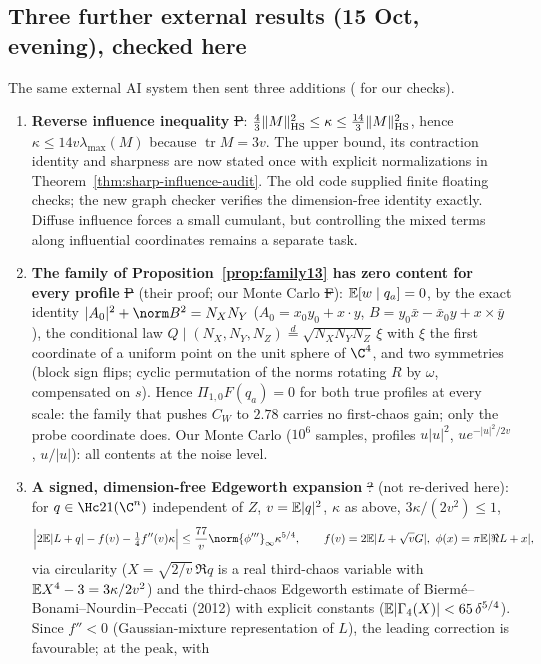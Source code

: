 \subsection{Three further external results (15 Oct, evening), checked here}\label{sec:wct-external}
The same external AI system then sent three additions ( for our checks).
\begin{enumerate}
\item \textbf{Reverse influence inequality} \st{P}: $\frac43\|M\|_{\rm HS}^2\le\kappa\le\frac{14}3\|M\|_{\rm HS}^2$, hence $\kappa\le14v\lambda_{\max}(M)$ because $\operatorname{tr}M=3v$. The upper bound, its contraction identity and sharpness are now stated once with explicit normalizations in Theorem~\ref{thm:sharp-influence-audit}. The old code  supplied finite floating checks; the new graph checker verifies the dimension-free identity exactly. Diffuse influence forces a small cumulant, but controlling the mixed terms along influential coordinates remains a separate task.
\item \textbf{The family of Proposition~\ref{prop:family13} has zero content for every profile} \st{P} (their proof; our Monte Carlo \st{F}): $\mathbb E[w\mid q_a]=0$, by the exact identity $|A_0|^2+\norm B^2=N_XN_Y$
($A_0=x_0y_0+x\cdot y$, $B=y_0\bar x-\bar x_0y+x\times\bar y$), the conditional law $Q\mid(N_X,N_Y,N_Z)\overset d=\sqrt{N_XN_YN_Z}\,\xi$ with $\xi$ the first coordinate of a uniform point
on the unit sphere of $\C^4$, and two symmetries (block sign flips; cyclic permutation of the norms rotating $R$ by $\omega$, compensated on $s$). Hence $\Pi_{1,0}F(q_a)=0$ for both true
profiles at every scale: the family that pushes $C_W$ to $2.78$ carries no first-chaos gain; only the probe coordinate does. Our Monte Carlo ($10^6$ samples, profiles $u|u|^2$,
$ue^{-|u|^2/2v}$, $u/|u|$): all contents at the noise level.
\item \textbf{A signed, dimension-free Edgeworth expansion} \st{?} (not re-derived here): for $q\in\Hc21(\C^n)$ independent of $Z$, $v=\mathbb E|q|^2$, $\kappa$ as above, $3\kappa/(2v^2)\le1$,
\[
\Bigl|2\E|L+q|-f(v)-\tfrac14f''(v)\kappa\Bigr|\le\frac{77}{v}\norm{\phi'''}_\infty\kappa^{5/4},\qquad f(v)=2\E|L+\sqrt vG|,\ \phi(x)=\pi\E|\Re L+x| ,
\]
via circularity ($X=\sqrt{2/v}\,\Re q$ is a real third-chaos variable with $\mathbb E X^4-3=3\kappa/2v^2$) and the third-chaos Edgeworth estimate of Bierm\'e--Bonami--Nourdin--Peccati (2012) with
explicit constants ($\mathbb E|\Gamma_4(X)|<65\,\delta^{5/4}$). Since $f''<0$ (Gaussian-mixture representation of $L$), the leading correction is favourable; at the peak, with

\end{enumerate}
